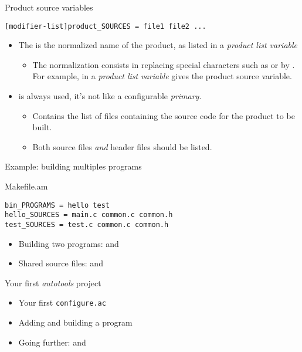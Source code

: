 \begin{frame}[fragile]{Product source variables}

    \begin{block}{}
{\small
\begin{verbatim}
[modifier-list]product_SOURCES = file1 file2 ...
\end{verbatim}}
\end{block}

\begin{itemize}

\item The  is the normalized name of the product, as
  listed in a {\em product list variable}
  \begin{itemize}
  \item The normalization consists in replacing special characters
    such as  or \code{+} by \code{_}. For example,
     in a {\em product list variable} gives the
     product source variable.
  \end{itemize}
\item {} is always used, it's not like a configurable {\em
    primary}.
  \begin{itemize}
  \item Contains the list of files containing the source code for the
    product to be built.
  \item Both source files {\em and} header files should be listed.
  \end{itemize}
\end{itemize}

\end{frame}

\begin{frame}[fragile]{Example: building multiples programs}
  \begin{block}{Makefile.am}
    {\small
\begin{verbatim}
bin_PROGRAMS = hello test
hello_SOURCES = main.c common.c common.h
test_SOURCES = test.c common.c common.h
\end{verbatim}}
  \end{block}
  \begin{itemize}
  \item Building two programs:  and 
  \item Shared source files:  and 
  \end{itemize}
\end{frame}

\setuplabframe
{Your first {\em autotools} project}
{
  \begin{itemize}
  \item Your first {\tt configure.ac}
  \item Adding and building a program
  \item Going further:  and 
  \end{itemize}
}
